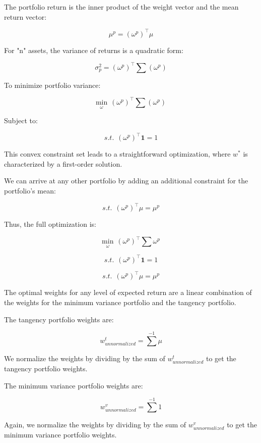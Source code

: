 \documentclass{article}
\begin{document}
The portfolio return is the inner product of the weight vector and the mean return vector:

$$
{\mu}^{p}=({\omega}^{p})^{\top}{\mu}
$$

For "n" assets, the variance of returns is a quadratic form:

$$
{\sigma}_{p}^{2}=({\omega^{p}})^{\top}{\sum}({\omega^{p}})
$$

To minimize portfolio variance:

$$
{\underset{\omega}{\text{min}}}\hspace{5pt}({\omega^{p}})^{\top}{\sum}({\omega^{p}})
$$

Subject to:

$$
s.t.\hspace{5pt}({\omega^{p}})^{\top}\textbf{1} = 1
$$

This convex constraint set leads to a straightforward optimization, where $w^{*}$ is characterized by a first-order solution.

We can arrive at any other portfolio by adding an additional constraint for the portfolio's mean:

$$
s.t.\hspace{5pt}({\omega^{p}})^{\top}{\mu} = {\mu}^{p}
$$

Thus, the full optimization is:

$$
{\underset{\omega}{\text{min}}}\hspace{5pt}({\omega^{p}})^{\top}{\sum}{\omega^{p}}
$$

$$
s.t.\hspace{5pt}({\omega^{p}})^{\top}\textbf{1} = 1
$$

$$
s.t.\hspace{5pt}({\omega^{p}})^{\top}{\mu} = {\mu}^{p}
$$

The optimal weights for any level of expected return are a linear combination of the weights for the minimum variance portfolio and the tangency portfolio.

The tangency portfolio weights are:

$$
w_{unnormalized}^{t}={\sum}^{-1}{\mu}
$$

We normalize the weights by dividing by the sum of $w_{unnormalized}^{t}$ to get the tangency portfolio weights.

The minimum variance portfolio weights are:

$$
w_{unnormalized}^{v}={\sum}^{-1}1
$$

Again, we normalize the weights by dividing by the sum of $w_{unnormalized}^{v}$ to get the minimum variance portfolio weights.
\end{document}
